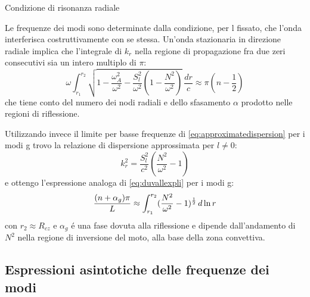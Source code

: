 \begin{frame}{Condizione di risonanza radiale}

Le frequenze dei modi sono determinate dalla condizione, per l fissato, che l'onda interferisca costruttivamente con se stessa. Un'onda stazionaria in direzione radiale implica che l'integrale di $k_r$ nella regione di propagazione fra due zeri consecutivi sia un intero multiplo di $\pi$:
\begin{equation}
\omega\int_{r_1}^{r_2}\sqrt{1-\frac{\omega_A^2}{\omega^2}-\frac{S_l^2}{\omega^2}(1-\frac{N^2}{\omega^2})}\,\frac{dr}{c}\approx\pi(n-\frac{1}{2})\label{eq:JWKBmode}
\end{equation}
che tiene conto del numero dei nodi radiali e dello sfasamento $\alpha$ prodotto nelle regioni di riflessione.


Utilizzando invece il limite per basse frequenze di \eqref{eq:approximatedispersion} per i modi g trovo la relazione di dispersione approssimata per $l\neq0$:
\begin{equation}
k_r^2=\frac{S_l^2}{c^2}(\frac{N^2}{\omega^2}-1)\label{eq:dispersionag}
\end{equation}
e ottengo l'espressione analoga di \eqref{eq:duvallexpli} per i modi g:
\begin{equation}\label{eq:duvallg}
\frac{(n+\alpha_g)\pi}{L}\approx\int_{r_1}^{r_2}(\frac{N^2}{\omega^2}-1)^{\frac{1}{2}}\,d\ln{r}
\end{equation}
con $r_2\approx R_{cz}$ e $\alpha_g$ \'e una fase dovuta alla riflessione e dipende dall'andamento di $N^2$ nella regione di inversione del moto, alla base della zona convettiva.

\end{frame}

\subsection{Espressioni asintotiche delle frequenze dei modi}

